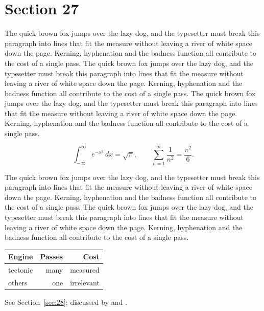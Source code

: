 \documentclass{article}
\begin{document}
\section{Section 27}
\label{sec:27}
The quick brown fox jumps over the lazy dog, and the typesetter must break this paragraph into lines that fit the measure without leaving a river of white space down the page. Kerning, hyphenation and the badness function all contribute to the cost of a single pass. The quick brown fox jumps over the lazy dog, and the typesetter must break this paragraph into lines that fit the measure without leaving a river of white space down the page. Kerning, hyphenation and the badness function all contribute to the cost of a single pass. The quick brown fox jumps over the lazy dog, and the typesetter must break this paragraph into lines that fit the measure without leaving a river of white space down the page. Kerning, hyphenation and the badness function all contribute to the cost of a single pass. 

\begin{equation}\label{eq:27}
\int_{-\infty}^{\infty} e^{-x^{2}}\,dx = \sqrt{\pi}, \qquad
\sum_{n=1}^{\infty} \frac{1}{n^{2}} = \frac{\pi^{2}}{6}.
\end{equation}

The quick brown fox jumps over the lazy dog, and the typesetter must break this paragraph into lines that fit the measure without leaving a river of white space down the page. Kerning, hyphenation and the badness function all contribute to the cost of a single pass. The quick brown fox jumps over the lazy dog, and the typesetter must break this paragraph into lines that fit the measure without leaving a river of white space down the page. Kerning, hyphenation and the badness function all contribute to the cost of a single pass. 

\begin{center}
\begin{tabular}{lrr}
\toprule
Engine & Passes & Cost \\
\midrule
tectonic & many & measured \\
others & one & irrelevant \\
\bottomrule
\end{tabular}
\end{center}

See Section~\ref{sec:28}; discussed by \textcite{k3} and \textcite{l5}.
\end{document}
